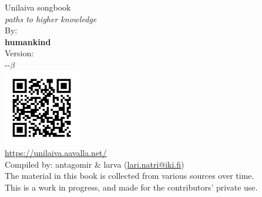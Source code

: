 \documentclass[twoside,10pt]{book}
\begin{document}
  \begin{titlepage}
    \thispagestyle{empty}
    \vspace*{\fill}
    \begin{center}
      \vspace{-0.8em} %
      \Huge Unilaiva songbook\\
      \normalsize \textit{paths to higher knowledge}\\
      \Large
      \vspace{3em}
      \large By:\\
      \Large \textbf{humankind}\\
      \vspace{1em}
      \large Version:\\
      \Large \the\year-\the\month-\the\day\hspace{0.34em}$\beta$
      \\
      \vspace*{\fill}
      \includegraphics[width=0.25\textwidth]{QR_https_unilaiva_aavalla_net.png}
      \\
      {\small\url{https://unilaiva.aavalla.net/}}
      \\
      \vspace*{\fill}
      {\footnotesize Compiled by: antagomir \& larva (\href{mailto:lari.natri@iki.fi}{lari.natri@iki.fi})}
      \\
      \vspace{1.5em}
      {\scriptsize
        The material in this book is collected from various sources over time.\\
        \vspace{-1em} %
        This is a work in progress, and made for the contributors' private use.
        \vspace{-1em} %
      }
    \end{center}
  \end{titlepage}
\end{document}
